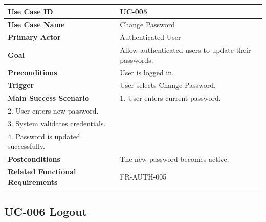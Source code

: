 \begin{longtable}{|p{4cm}|p{10cm}|}

\hline
\textbf{Use Case ID} &
UC-005 \\
\hline

\textbf{Use Case Name} &
Change Password \\
\hline

\textbf{Primary Actor} &
Authenticated User \\
\hline

\textbf{Goal} &
Allow authenticated users to update their passwords. \\
\hline

\textbf{Preconditions} &
User is logged in. \\
\hline

\textbf{Trigger} &
User selects Change Password. \\
\hline

\textbf{Main Success Scenario} &
1. User enters current password.\\
2. User enters new password.\\
3. System validates credentials.\\
4. Password is updated successfully.\\
\hline

\textbf{Postconditions} &
The new password becomes active. \\
\hline

\textbf{Related Functional Requirements} &
FR-AUTH-005 \\
\hline

\end{longtable}

\subsection{UC-006 Logout}

